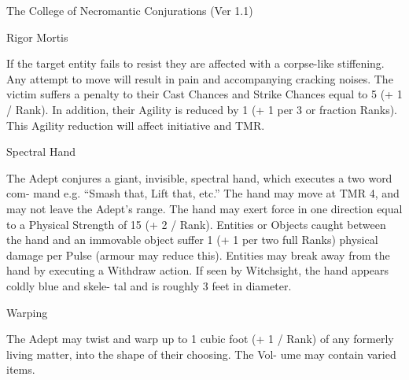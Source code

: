 \begin{Chapter}{The College of Necromantic Conjurations (Ver 1.1)}
\begin{spell}[G-9]{Rigor Mortis }
\begin{effects}
 If  the  target  entity  fails  to  resist  they  are 
affected with a corpse-like stiffening. Any attempt 
to  move  will  result  in  pain  and  accompanying 
cracking  noises.  The  victim  suffers  a  penalty  to 
their  Cast  Chances  and  Strike  Chances  equal  to  5 
(+  1  /  Rank).  In  addition,  their  Agility  is  reduced 
by  1  (+  1  per  3  or  fraction  Ranks).  This  Agility 
reduction will affect initiative and TMR. 

\end{effects}
\end{spell}

\begin{spell}[G-10]{Spectral Hand }

\begin{effects}
 The  Adept  conjures  a  giant,  invisible, 
spectral  hand,  which  executes  a  two  word  com-
mand  e.g.  “Smash  that,  Lift  that,  etc.”  The  hand 
may  move  at  TMR  4,  and  may  not  leave  the 
Adept’s  range.  The  hand  may  exert  force  in  one 
direction  equal  to  a  Physical  Strength  of  15  (+ 2  / 
Rank). Entities or Objects caught between the hand 
and an immovable object suffer 1 (+ 1 per two full 
Ranks)  physical  damage  per  Pulse  (armour  may 
reduce  this).  Entities  may  break  away  from  the 
hand  by  executing  a  Withdraw  action.  If  seen  by 
Witchsight, the hand appears coldly blue and skele-
tal and is roughly 3 feet in diameter. 

\end{effects}
\end{spell}

\begin{spell}[G-11]{Warping }

\begin{effects}
 The  Adept  may  twist  and  warp  up  to  1 
cubic  foot  (+  1  /  Rank)  of  any  formerly  living 
matter,  into  the  shape  of  their  choosing.  The  Vol-
ume may contain varied items. 


\end{effects}
\end{spell}
\end{Chapter}
